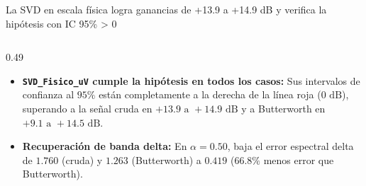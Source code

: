 \documentclass[aspectratio=169,9pt]{beamer}
\begin{document}
\begin{frame}{La SVD en escala f\'isica logra ganancias de +13.9 a +14.9 dB y verifica la hip\'otesis con IC 95\% > 0}
\begin{columns}[T,onlytextwidth]
\begin{column}{0.49\textwidth}
      \vspace{0.06cm}

      \begin{tcolorbox}[tealcard, title={\scriptsize\bfseries Verificaci\'on de la Hip\'otesis de Investigaci\'on}, colbacktitle=UDTeal!85!black, coltitle=white]
        \tiny
        \begin{itemize}
          \item \textbf{\texttt{SVD\_Fisico\_uV} cumple la hip\'otesis en todos los casos:} Sus intervalos de confianza al $95\%$ están completamente a la derecha de la l\'inea roja ($0\text{ dB}$), superando a la se\~nal cruda en $+13.9\text{ a }+14.9\text{ dB}$ y a Butterworth en $+9.1\text{ a }+14.5\text{ dB}$.
          \item \textbf{Recuperaci\'on de banda delta:} En $\alpha=0.50$, baja el error espectral delta de $1.760$ (cruda) y $1.263$ (Butterworth) a $\mathbf{0.419}$ ($66.8\%$ menos error que Butterworth).
        \end{itemize}
      \end{tcolorbox}
    \end{column}
  \end{columns}
\end{frame}
\end{document}
